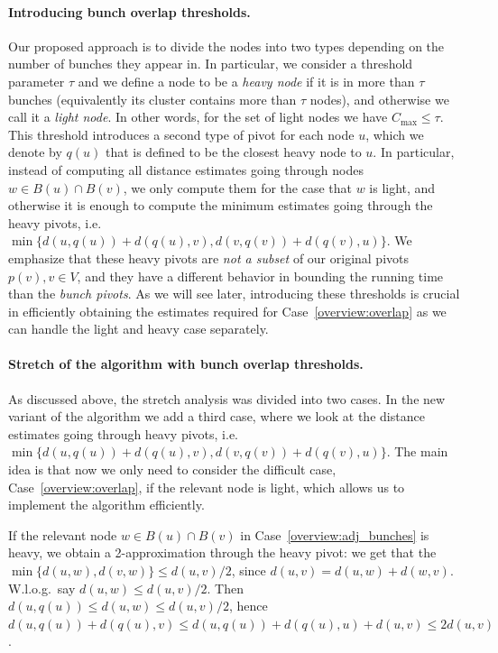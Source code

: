 \paragraph{Introducing bunch overlap thresholds.} Our proposed approach is to divide the nodes into two types depending on the number of bunches they appear in.
In particular, we consider a threshold parameter $\tau$ and we define a node to be a \textit{heavy node} if it is in more than $\tau$ bunches (equivalently its cluster contains more than $ \tau $ nodes), and otherwise we call it a \textit{light node}. In other words, for the set of light nodes we have $C_{\max}\leq \tau$. This threshold introduces a second type of pivot for each node $u$, which we denote by $q(u)$ that is defined to be the closest heavy node to $u$. In particular, instead of computing all distance estimates going through nodes $w \in B(u) \cap B(v)$, we only compute them for the case that $w$ is light, and otherwise it is enough to compute the minimum estimates going through the heavy pivots, i.e.~$\min \{ d(u,q(u))+d(q(u),v), d(v,q(v))+d(q(v),u)\}$. We emphasize that these heavy pivots are \textit{not a subset} of our original pivots $p(v), v \in V$, and they have a different behavior in bounding the running time than the \textit{bunch pivots}.
 As we will see later, introducing these thresholds is crucial in efficiently obtaining the estimates required for Case~\ref{overview:overlap} as we can handle the light and heavy case separately.


\paragraph{Stretch of the algorithm with bunch overlap thresholds.} As discussed above, the stretch analysis was divided into two cases. In the new variant of the algorithm we add a third case, where we look at the distance estimates going through heavy pivots, i.e.~$\min \{ d(u,q(u))+d(q(u),v), d(v,q(v))+d(q(v),u)\}$. The main idea is that now we only need to consider the difficult case, Case~\ref{overview:overlap}, if the relevant node is light, which allows us to implement the algorithm efficiently. 

If the relevant node $w\in B(u)\cap B(v)$ in Case~\ref{overview:adj_bunches} is heavy, we obtain a 2-approximation through the heavy pivot: we get that the $\min\{d(u,w),d(v,w)\} \leq d(u,v)/2$, since $d(u,v)= d(u,w)+d(w,v)$. W.l.o.g.\ say $d(u,w)\leq d(u,v)/2$. Then $d(u,q(u))\leq d(u,w)\leq d(u,v)/2$, hence $d(u,q(u))+d(q(u),v)\leq d(u,q(u))+d(q(u),u)+d(u,v) \leq 2d(u,v)$. 

